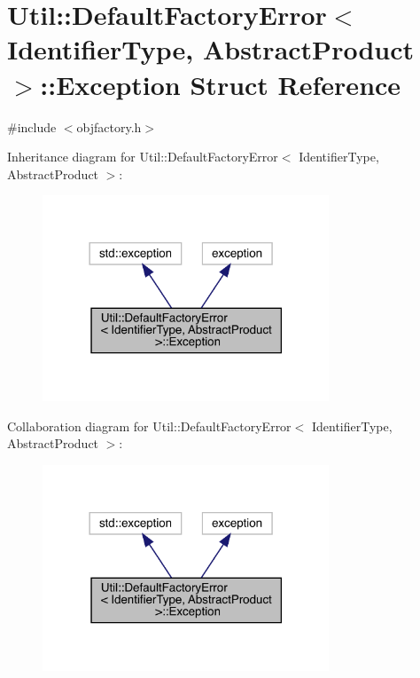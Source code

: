 \hypertarget{structUtil_1_1DefaultFactoryError_1_1Exception}{}\section{Util\+:\+:Default\+Factory\+Error$<$ Identifier\+Type, Abstract\+Product $>$\+:\+:Exception Struct Reference}
\label{structUtil_1_1DefaultFactoryError_1_1Exception}


{\ttfamily \#include $<$objfactory.\+h$>$}



Inheritance diagram for Util\+:\+:Default\+Factory\+Error$<$ Identifier\+Type, Abstract\+Product $>$\+:\nopagebreak
\begin{figure}[H]
\begin{center}
\leavevmode
\includegraphics[width=242pt]{df/df3/structUtil_1_1DefaultFactoryError_1_1Exception__inherit__graph}
\end{center}
\end{figure}


Collaboration diagram for Util\+:\+:Default\+Factory\+Error$<$ Identifier\+Type, Abstract\+Product $>$\+:\nopagebreak
\begin{figure}[H]
\begin{center}
\leavevmode
\includegraphics[width=242pt]{d6/dbd/structUtil_1_1DefaultFactoryError_1_1Exception__coll__graph}
\end{center}
\end{figure}
